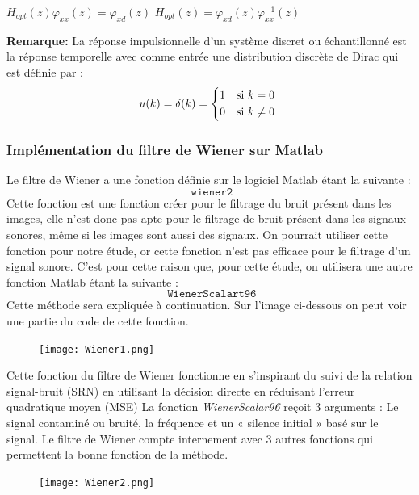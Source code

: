 \documentclass[conference,onecolumn]{IEEEtran}
\begin{document}
    \medskip 
\begin{center}
   $H_{opt}(z)\varphi_{xx}(z)=\varphi_{xd}(z)$
   \medskip 
    $H_{opt}(z)=\varphi_{xd}(z)\varphi^{-1}_{xx}(z)$
   \medskip 
\end{center}
 \textbf{Remarque: } La réponse impulsionnelle d'un système discret ou échantillonné est la réponse temporelle avec comme entrée une distribution discrète de Dirac qui est définie par :
\begin{equation}
	u(k) = \delta(k) = 
	\begin{cases*}
		1 & si $k = 0$ \\
		0 & si $k \neq 0$
	\end{cases*}
 \end{equation}

 \subsubsection{Implémentation du filtre de Wiener sur Matlab} \medskip 
Le filtre de Wiener a une fonction définie sur le logiciel Matlab étant la suivante :
\[\texttt{ wiener2}\]
Cette fonction est une fonction créer pour le filtrage du bruit présent dans les images, elle n’est donc pas apte pour le filtrage de bruit présent dans les signaux sonores, même si les images sont aussi des signaux. On pourrait utiliser cette fonction pour notre étude, or cette fonction n’est pas efficace pour le filtrage d’un signal sonore. C’est pour cette raison que, pour cette étude, on utilisera une autre fonction Matlab étant la suivante :
\[\texttt{ WienerScalart96}\]
Cette méthode sera expliquée à continuation. Sur l’image ci-dessous on peut voir une partie du code de cette fonction.
\medskip
\begin{figure}[H]
 \centering
    \texttt{[image: Wiener1.png]}
\end{figure}

Cette fonction du filtre de Wiener fonctionne en s’inspirant du suivi de la relation signal-bruit (SRN) en utilisant la décision directe en réduisant l’erreur quadratique moyen (MSE) 
\medskip
La fonction \textit{WienerScalar96} reçoit 3 arguments : Le signal contaminé ou bruité, la fréquence et un « silence initial » basé sur le signal. 
\medskip 
Le filtre de Wiener compte internement avec 3 autres fonctions qui permettent la bonne fonction de la méthode. 
\medskip
\begin{figure}[H]
 \centering
    \texttt{[image: Wiener2.png]}
    \medskip
\end{figure}
\end{document}
